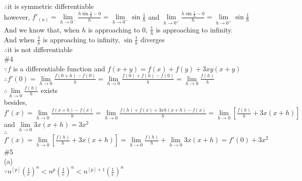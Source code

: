 \documentclass{article}
\begin{document}
$\therefore$\qquad it is symmetric differentiable\\

however, $\displaystyle f'_(a)=\lim \limits_{h \to 0^-}\frac{h\sin\frac{1}{h}-0}{h}=\lim \limits_{h \to 0^-}\sin\frac{1}{h}$ and $\displaystyle\lim \limits_{h \to 0^+}\frac{h\sin\frac{1}{h}-0}{h}=\lim \limits_{h \to 0^+}\sin\frac{1}{h}$\\

And we know that, when $h$ is approaching to $0$, $\displaystyle\frac{1}{h}$ is approaching to infinity.\\

And when $\displaystyle\frac{1}{h}$ is approaching to infinity, $\sin \displaystyle\frac{1}{h}$ diverges\\

$\therefore$\qquad it is not differentiable\\

\textcolor[rgb]{0.00,0.00,0.50}{\#4}\\

$\because$\qquad $f$ is a differentiable function and $f(x+y)=f(x)+f(y)+3xy(x+y)$\\

$\therefore$\qquad$\displaystyle f'(0)=\lim \limits_{h \to 0}\frac{f(0+h)-f(0)}{h}=\lim \limits_{h \to 0}\frac{f(0)+f(h)-f(0)}{h}=\lim \limits_{h \to 0}\frac{f(h)}{h}$\\

$\therefore$\qquad$\displaystyle\lim \limits_{h \to 0}\frac{f(h)}{h}$ exists\\

besides, $\displaystyle f'(x)=\lim \limits_{h \to 0}\frac{f(x+h)-f(x)}{h}=\lim \limits_{h \to 0}\frac{f(h)+f(x)+3xh(x+h)-f(x)}{h}=\lim \limits_{h \to 0}\left[\frac{f(h)}{h}+3x(x+h)\right]$ and $\lim \limits_{h \to 0}3x(x+h)=3x^2$\\

$\therefore$\qquad$\displaystyle f'(x)=\lim \limits_{h \to 0}\left[\frac{f(h)}{h}+3x(x+h)\right]=\lim \limits_{h \to 0}\frac{f(h)}{h}+\lim \limits_{h \to 0}3x(x+h)=f'(0)+3x^2$\\

\textcolor[rgb]{0.00,0.00,0.50}{\#5}\\

(a)\\

$\because$\qquad$\displaystyle n^{[p]}\left(\frac{1}{e}\right)^n<n^p\left(\frac{1}{e}\right)^n<n^{[p]+1}\left(\frac{1}{e}\right)^n$\\
\end{document}

